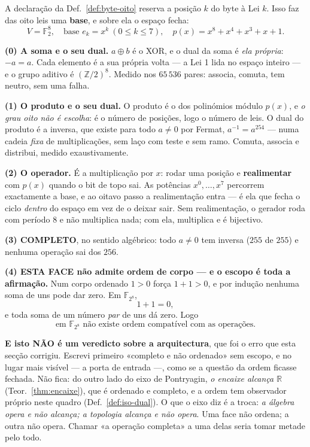 \documentclass[livro.tex]{subfiles}
\begin{document}
\begin{teorema}\label{thm:espaco-oito}
A declaração da Def.~\ref{def:byte-oito} reserva a posição $k$ do byte à
Lei $k$. Isso faz das oito leis uma \textbf{base}, e sobre ela o espaço
fecha:
\[
\boxed{\;
V=\mathbb{F}_2^{8},\quad
\text{base } e_k=x^{k}\ (0\le k\le 7),\quad
p(x)=x^{8}+x^{4}+x^{3}+x+1 .\;}
\]

\textbf{(0) A soma e o seu dual.} $a\oplus b$ é o XOR, e o dual da soma
é \emph{ela própria}: $-a=a$. Cada elemento é a sua própria volta --- a
Lei 1 lida no espaço inteiro --- e o grupo aditivo é $(\mathbb{Z}/2)^8$.
Medido nos $65\,536$ pares: associa, comuta, tem neutro, sem uma falha.

\textbf{(1) O produto e o seu dual.} O produto é o dos polinómios
módulo $p(x)$, e \emph{o grau oito não é escolha}: é o número de
posições, logo o número de leis. O dual do produto é a inversa, que
existe para todo $a\neq0$ por Fermat, $a^{-1}=a^{254}$ --- numa cadeia
\emph{fixa} de multiplicações, sem laço com teste e sem ramo. Comuta,
associa e distribui, medido exaustivamente.

\textbf{(2) O operador.} É a multiplicação por $x$: rodar uma posição e
\textbf{realimentar} com $p(x)$ quando o bit de topo sai. As potências
$x^0,\ldots,x^7$ percorrem exactamente a base, e ao oitavo passo a
realimentação entra --- é ela que fecha o ciclo \emph{dentro} do espaço
em vez de o deixar sair. Sem realimentação, o gerador roda com período
$8$ e não multiplica nada; com ela, multiplica e é bijectivo.

\textbf{(3) COMPLETO}, no sentido algébrico: todo $a\neq0$ tem inversa
($255$ de $255$) e nenhuma operação sai dos $256$.

\textbf{(4) ESTA FACE não admite ordem de corpo --- e o escopo é toda a
afirmação.} Num corpo ordenado $1>0$ força $1+1>0$, e por indução nenhuma
soma de uns pode dar zero. Em $\mathbb{F}_{2^8}$,
\[
1+1=0,
\]
e toda soma de um número \emph{par} de uns dá zero. Logo
\[
\boxed{\;\text{em }\mathbb{F}_{2^8}\text{ não existe ordem compatível com
as operações.}\;}
\]

\textbf{E isto NÃO é um veredicto sobre a arquitectura}, que foi o erro
que esta secção corrigiu. Escrevi primeiro «completo e não ordenado» sem
escopo, e no lugar mais visível --- a porta de entrada ---, como se a
questão da ordem ficasse fechada. Não fica: do outro lado do eixo de
Pontryagin, \emph{o encaixe alcança $\mathbb{R}$}
(Teor.~\ref{thm:encaixe}), que é ordenado e completo, e a ordem tem
observador próprio neste quadro (Def.~\ref{def:iso-dual}). O que o eixo
diz é a troca: \emph{a álgebra opera e não alcança; a topologia alcança e
não opera}. Uma face não ordena; a outra não opera. Chamar «a operação
completa» a uma delas seria tomar metade pelo todo.


\end{teorema}
\end{document}
